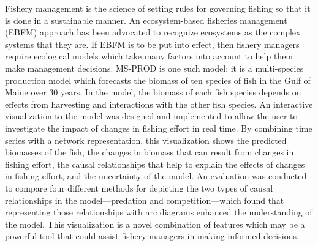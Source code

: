 \begin{abstractpage} 

Fishery management is the science of setting rules for governing fishing so that it is done in a sustainable manner.  An ecosystem-based fisheries management (EBFM) approach has been advocated to recognize ecosystems as the complex systems that they are.  If EBFM is to be put into effect, then fishery managers require ecological models which take many factors into account to help them make management decisions. MS-PROD is one such model; it is a multi-species production model which forecasts the biomass of ten species of fish in the Gulf of Maine over 30 years.  In the model, the biomass of each fish species depends on effects from harvesting and interactions with the other fish species.  An interactive visualization to the model was designed and implemented to allow the user to investigate the impact of changes in fishing effort in real time.  By combining time series with a network representation, this visualization shows the predicted biomasses of the fish, the changes in biomass that can result from changes in fishing effort, the causal relationships that help to explain the effects of changes in fishing effort, and the uncertainty of the model.  An evaluation was conducted to compare four different methods for depicting the two types of causal relationships in the model---predation and competition---which found that representing those relationships with arc diagrams enhanced the understanding of the model.  This visualization is a novel combination of features which may be a powerful tool that could assist fishery managers in making informed decisions.

\end{abstractpage}